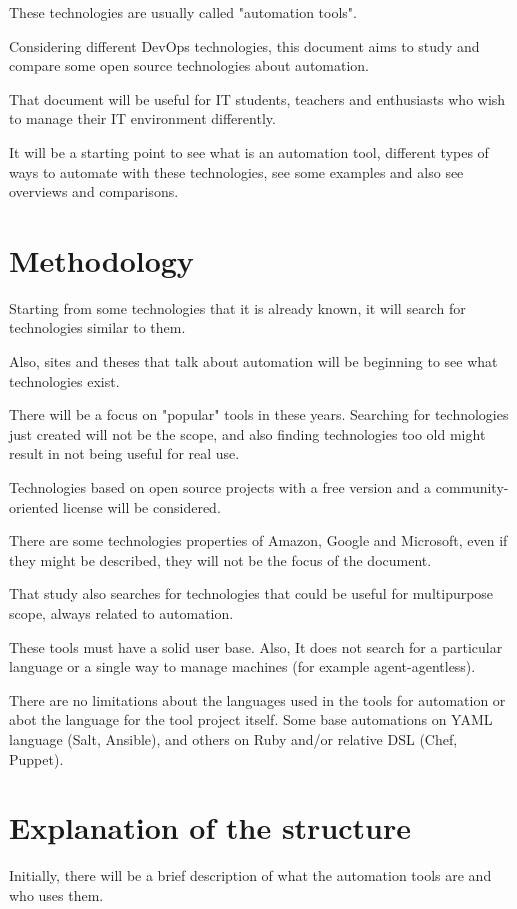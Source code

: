 \documentclass[12pt,a4paper,openright,twoside]{book}
\begin{document}
These technologies are usually called "automation tools".

Considering different DevOps technologies, this document aims to study and compare some open source technologies about automation.

That document will be useful for IT students, teachers and enthusiasts who wish to manage their IT environment differently.

It will be a starting point to see what is an automation tool, different types of ways to automate with these technologies, see some examples and also see overviews and comparisons.

\section{Methodology}
Starting from some technologies that it is already known, it will search for technologies similar to them.


Also, sites and theses that talk about automation will be beginning to see what technologies exist.


There will be a focus on "popular" tools in these years. Searching for technologies just created will not be the scope, and also finding technologies too old might result in not being useful for real use.


Technologies based on open source projects with a free version and a community-oriented license will be considered.


There are some technologies properties of Amazon, Google and Microsoft, even if they might be described, they will not be the focus of the document.


That study also searches for technologies that could be useful for multipurpose scope, always related to automation.


These tools must have a solid user base. Also, It does not search for a particular language or a single way to manage machines (for example agent-agentless).


There are no limitations about the languages used in the tools for automation or abot the language for the tool project itself. Some base automations on YAML language (Salt, Ansible), and others on Ruby and/or relative DSL (Chef, Puppet).

\section{Explanation of the structure}
Initially, there will be a brief description of what the automation tools are and who uses them.
\end{document}
